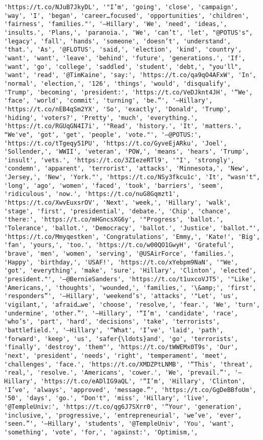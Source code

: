 \documentclass[11pt]{article}
\begin{document}
\begin{Verbatim}[commandchars=\\\{\}]
'https://t.co/NJuB7JkyDL', '"I’m', 'going', 'close', 'campaign', 'way', 'I', 'began', 'career…focused', 'opportunities', 'children', 'fairness', 'families."', '—Hillary', 'We', 'need', 'ideas,', 'insults.', 'Plans,', 'paranoia.', 'We', 'can’t', 'let', "@POTUS's", 'legacy', 'fall', 'hands', 'someone', 'doesn’t', 'understand', 'that.', 'As', '@FLOTUS', 'said,', 'election', 'kind', 'country', 'want', 'want', 'leave', 'behind', 'future', 'generations.', 'If', 'want', 'go', 'college', 'saddled', 'student', 'debt,', "you'll", 'want', 'read', '@TimKaine', 'say:', 'https://t.co/qa9qO4AFxW', 'In', 'normal', 'election,', '126', 'things', 'would', 'disqualify', 'Trump', 'becoming', 'president:', 'https://t.co/VeDJknt4JH', '“We', 'face', 'world', 'commit', 'turning', 'be.”', '—Hillary', 'https://t.co/nEB4qSm2YX', 'So', 'exactly', 'Donald', 'Trump', 'hiding', 'voters?', 'Pretty', 'much', 'everything.', 'https://t.co/RGUqGN4I7i', '"Read', 'history.', 'It', 'matters.', "We've", 'got', 'get', 'people', 'vote."', '—@POTUS:', 'https://t.co/tTgeqy51PU', 'https://t.co/GyveEjARku', 'Joel', 'Sollender,', 'WWII', 'veteran', 'POW,', 'means', 'hears', 'Trump', 'insult', 'vets.', 'https://t.co/3ZIezeRTl9', '"I', 'strongly', 'condemn', 'apparent', 'terrorist', 'attacks', 'Minnesota,', 'New', 'Jersey,', 'New', 'York."', 'https://t.co/NSy3fkcu1c', 'It', "wasn't", 'long', 'ago', 'women', 'faced', 'took', 'barriers', 'seem', 'ridiculous', 'now.', 'https://t.co/nuG8Gqmzt1', 'https://t.co/XwvEuxsrOV', 'Next', 'week,', 'Hillary', 'walk', 'stage', 'first', 'presidential', 'debate.', 'Chip', 'chance', 'there:', 'https://t.co/mHGncsXG6y', '"Progress', 'ballot.', 'Tolerance', 'ballot.', 'Democracy', 'ballot.', 'Justice', 'ballot."', 'https://t.co/Mmyqestken', 'Congratulations', 'Emmy,', 'Kate!', 'Big', 'fan', 'yours,', 'too.', 'https://t.co/w00QO1GwyH', 'Grateful', 'brave', 'men', 'women', 'serving', '@USAirForce', 'families.', 'Happy', 'birthday,', 'USAF!', 'https://t.co/xYebpm9NaN', '"We', 'got', 'everything', 'make', 'sure', 'Hillary', 'Clinton', 'elected', 'president."', '—@BernieSanders', 'https://t.co/t1uxcoVJT5', '"Like', 'Americans,', 'thoughts', 'wounded,', 'families,', '\&amp;', 'first', 'responders”', '—Hillary', 'weekend’s', 'attacks', '"Let', 'us', 'vigilant,', 'afraid…we', 'choose', 'resolve,', 'fear.', 'We', 'turn', 'undermine', 'other.”', '—Hillary', '“I’m', 'candidate', 'race', 'who’s', 'part', 'hard', 'decisions', 'take', 'terrorists', 'battlefield.', '—Hillary', '“What', 'I’ve', 'laid', 'path', 'forward', 'keep', 'us', 'safer{\ldots}and', 'go', 'terrorists', 'finally', 'destroy', 'them"', 'https://t.co/tWWEMx0T9s', 'Our', 'next', 'president', 'needs', 'right', 'temperament', 'meet', 'challenges', 'face.', 'https://t.co/XMDZPtLNMB', '“This', 'threat', 'real,', 'resolve.', 'Americans', 'cower.', 'We', 'prevail.”', '—Hillary', 'https://t.co/eADlIG9aQL', '“I’m', 'Hillary', 'Clinton', 'I’ve', 'always', 'approved', 'message.”', 'https://t.co/GgDeBBfoUm', '50', 'days', 'go.', "Don't", 'miss', 'Hillary', 'live', '@TempleUniv:', 'https://t.co/qg6J7SXrr0', '“Your', 'generation', 'inclusive,', 'progressive,', 'entrepreneurial', 'we’ve', 'ever', 'seen.”', '—Hillary', 'students', '@TempleUniv', 'You', 'want', 'something', 'vote', 'for,', 'against:', 'Optimism,', 
\end{Verbatim}
\end{document}
